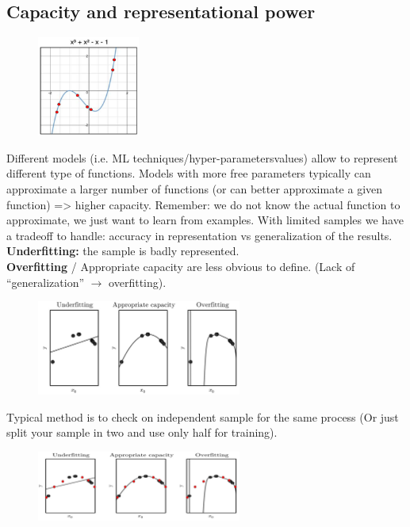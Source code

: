 \subsection{Capacity and representational power}

\begin{figure}
	\includegraphics[width=0.3\textwidth]{figure_ml/capacity.png}
\end{figure} 

Different models (i.e. ML techniques/hyper-parametersvalues) allow to represent different type of functions.
Models with more free parameters typically can approximate a larger number
of functions (or can better approximate a given function) => higher capacity.
Remember: we do not know the actual function to approximate, we just want
to learn from examples.
With limited samples we have a tradeoff to
handle: accuracy in representation vs generalization of the results.\\


\noindent
\textbf{Underfitting:} the sample is badly represented.\\
\textbf{Overfitting} / Appropriate capacity are less obvious to define. (Lack of “generalization” $\rightarrow$ overfitting).

\begin{figure}[ht]
	\centering
	\includegraphics[width=0.6\textwidth]{figure_ml/u_a_o.png}
\end{figure}
\FloatBarrier

Typical method is to check on independent sample for the same process (Or just split your sample in two and use only half for training).

\begin{figure}
	\centering
	\includegraphics[width=0.6\textwidth]{figure_ml/u_a_o2.png}
\end{figure}
\FloatBarrier

